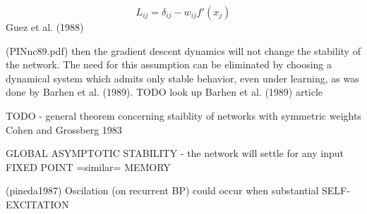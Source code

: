 $$L_{ij} = \delta_{ij} - w_{ij}f'(x_j)$$
Guez et al. (1988) 

(PINnc89.pdf) then the gradient descent dynamics will not change the stability of the network. The need
for this assumption can be eliminated by choosing a dynamical system
which admits only stable behavior, even under learning, as was done by
Barhen et al. (1989). TODO look up Barhen et al. (1989) article 

TODO - general theorem concerning staiblity of networks with symmetric weights Cohen and Grossberg 1983 

GLOBAL ASYMPTOTIC STABILITY - the network will settle for any input 
FIXED POINT =similar= MEMORY

(pineda1987) Oscilation (on recurrent BP) could occur when substantial SELF-EXCITATION 


